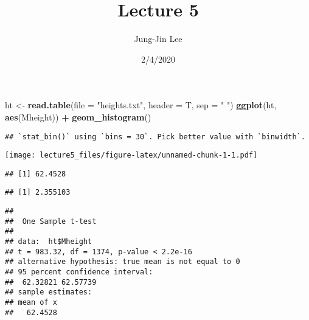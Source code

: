 \documentclass[]{article}
\title{Lecture 5}
\author{Jung-Jin Lee}
\date{2/4/2020}
\newenvironment{Shaded}{\begin{snugshade}}{\end{snugshade}}
\newcommand{\DataTypeTok}[1]{\textcolor[rgb]{0.13,0.29,0.53}{#1}}
\newcommand{\KeywordTok}[1]{\textcolor[rgb]{0.13,0.29,0.53}{\textbf{#1}}}
\newcommand{\NormalTok}[1]{#1}
\newcommand{\OperatorTok}[1]{\textcolor[rgb]{0.81,0.36,0.00}{\textbf{#1}}}
\newcommand{\StringTok}[1]{\textcolor[rgb]{0.31,0.60,0.02}{#1}}
\begin{document}
\maketitle

\begin{Shaded}
\begin{Highlighting}[]
\NormalTok{ht <-}\StringTok{ }\KeywordTok{read.table}\NormalTok{(}\DataTypeTok{file =} \StringTok{"heights.txt"}\NormalTok{, }\DataTypeTok{header =}\NormalTok{ T, }\DataTypeTok{sep =} \StringTok{" "}\NormalTok{)}
\KeywordTok{ggplot}\NormalTok{(ht, }\KeywordTok{aes}\NormalTok{(Mheight)) }\OperatorTok{+}\StringTok{ }
\StringTok{  }\KeywordTok{geom_histogram}\NormalTok{()}
\end{Highlighting}
\end{Shaded}

\begin{verbatim}
## `stat_bin()` using `bins = 30`. Pick better value with `binwidth`.
\end{verbatim}

\texttt{[image: lecture5\_files/figure-latex/unnamed-chunk-1-1.pdf]}

\begin{Shaded}
\end{Shaded}

\begin{verbatim}
## [1] 62.4528
\end{verbatim}

\begin{Shaded}
\end{Shaded}

\begin{verbatim}
## [1] 2.355103
\end{verbatim}

\begin{Shaded}
\end{Shaded}

\begin{verbatim}
## 
##  One Sample t-test
## 
## data:  ht$Mheight
## t = 983.32, df = 1374, p-value < 2.2e-16
## alternative hypothesis: true mean is not equal to 0
## 95 percent confidence interval:
##  62.32821 62.57739
## sample estimates:
## mean of x 
##   62.4528
\end{verbatim}
\end{document}
